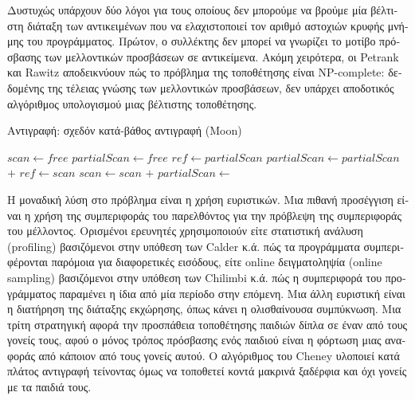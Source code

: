 \begin{greek}
Δυστυχώς υπάρχουν δύο λόγοι για τους οποίους δεν μπορούμε να
βρούμε μία βέλτιστη διάταξη των αντικειμένων που να ελαχιστοποιεί
τον αριθμό αστοχιών κρυφής μνήμης του προγράμματος. Πρώτον, ο
συλλέκτης δεν μπορεί να γνωρίζει το μοτίβο πρόσβασης των μελλοντικών
προσβάσεων σε αντικείμενα. Ακόμη χειρότερα, οι Petrank και Rawitz
\cite{DBLP:conf/popl/PetrankR02} αποδεικνύουν πώς το πρόβλημα της τοποθέτησης είναι NP-complete:
δεδομένης της τέλειας γνώσης των μελλοντικών προσβάσεων, δεν
υπάρχει αποδοτικός αλγόριθμος υπολογισμού μιας βέλτιστης τοποθέτησης.

\begin{algorithm}[H]
  \caption{Αντιγραφή: σχεδόν κατά-βάθος αντιγραφή (Moon)}
  \label{alg:c_4}
  \begin{algorithmic}[1]
      \State $scan \gets free$
      \State $partialScan \gets free$
    \EndProcedure
    \Statex
      \State {} 
    \EndProcedure
    \Statex
        \State $ref \gets partialScan$ 
        \State $partialScan \gets partialScan$ $+$ 
      \Else
        \State $ref \gets scan$ 
        \State $scan \gets scan$ $+$ 
      \EndIf
      \State {}
    \EndProcedure
    \Statex
     
      \State $partialScan \gets$ 
    \EndProcedure
  \end{algorithmic}
\end{algorithm}

Η μοναδική λύση στο πρόβλημα είναι η χρήση ευριστικών. Μια πιθανή
προσέγγιση είναι η χρήση της συμπεριφοράς του παρελθόντος για την
πρόβλεψη της συμπεριφοράς του μέλλοντος. Ορισμένοι ερευνητές 
χρησιμοποιούν είτε στατιστική ανάλυση (profiling) βασιζόμενοι στην υπόθεση
των Calder κ.ά. \cite{DBLP:conf/asplos/CalderKJA98} πώς τα προγράμματα συμπεριφέρονται παρόμοια
για διαφορετικές εισόδους, είτε online δειγματοληψία (online sampling)
βασιζόμενοι στην υπόθεση των Chilimbi κ.ά. \cite{DBLP:conf/pldi/ChilimbiHL99}
πώς η συμπεριφορά του προγράμματος παραμένει η ίδια από μία
περίοδο στην επόμενη. Μια άλλη ευριστική είναι η διατήρηση της
διάταξης εκχώρησης, όπως κάνει η ολισθαίνουσα συμπύκνωση. Μια
τρίτη στρατηγική αφορά την προσπάθεια τοποθέτησης παιδιών δίπλα
σε έναν από τους γονείς τους, αφού ο μόνος τρόπος πρόσβασης ενός
παιδιού είναι η φόρτωση μιας αναφοράς από κάποιον από τους γονείς
αυτού. Ο αλγόριθμος του Cheney υλοποιεί κατά πλάτος αντιγραφή
τείνοντας όμως να τοποθετεί κοντά μακρινά ξαδέρφια και όχι γονείς
με τα παιδιά τους.


\end{greek}
